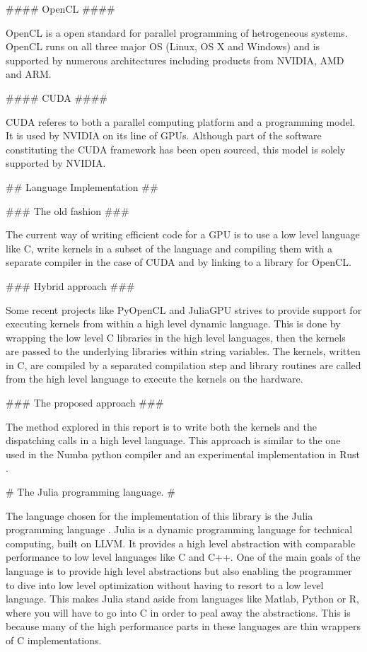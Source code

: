 \begin{markdown}
#### OpenCL ####

\gls{OpenCL} is a open standard for parallel programming of
hetrogeneous systems. \gls{OpenCL} runs on all three major OS (Linux,
OS X and Windows) and is supported by numerous architectures including
products from NVIDIA, \gls{AMD} and ARM.

#### CUDA ####

\gls{CUDA} referes to both a parallel computing platform and a
programming model. It is used by NVIDIA on its line of GPUs. Although
part of the software constituting the \gls{CUDA} framework has been
open sourced, this model is solely supported by NVIDIA.

## Language Implementation ##

### The old fashion ###

The current way of writing efficient code for a \gls{GPU} is to use a
low level language like C, write kernels in a subset of the language
and compiling them with a separate compiler in the case of \gls{CUDA}
and by linking to a library for \gls{OpenCL}.

### Hybrid approach ###

Some recent projects like PyOpenCL \cite{pyopencl} and JuliaGPU
\cite{JuliaGPU} strives to provide support for executing kernels from
within a high level dynamic language. This is done by wrapping the low
level C libraries in the high level languages, then the kernels are
passed to the underlying libraries within string variables. The
kernels, written in C, are compiled by a separated compilation step
and library routines are called from the high level language to
execute the kernels on the hardware.

### The proposed approach ###

The method explored in this report is to write both the kernels and
the dispatching calls in a high level language. This approach is
similar to the one used in the Numba python compiler \cite{numba} and
an experimental implementation in Rust \cite{rustgpu}.

# The Julia programming language. #

The language chosen for the implementation of this library is the
Julia programming language \cite{julia}. Julia is a dynamic
programming language for technical computing, built on \gls{LLVM}. It
provides a high level abstraction with comparable performance to low
level languages like C and C++. One of the main goals of the language
is to provide high level abstractions but also enabling the programmer
to dive into low level optimization without having to resort to a
low level language. This makes Julia stand aside from languages like
Matlab, Python or R, where you will have to go into C in order to peal
away the abstractions. This is because many of the high performance parts
in these languages are thin wrappers of C implementations. 


\end{markdown}
